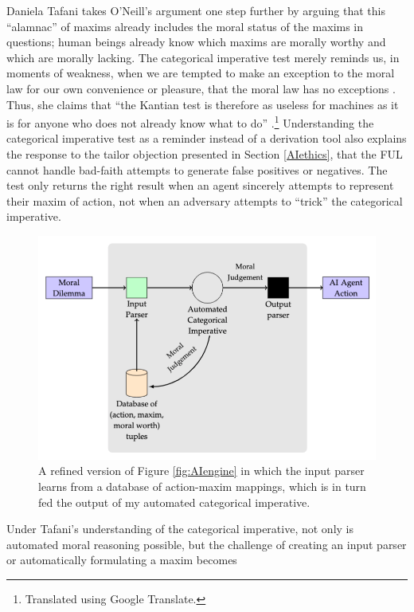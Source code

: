 \begin{isabellebody}
\begin{isamarkuptext}
Daniela Tafani takes O'Neill's argument one step further by arguing that this ``alamnac'' of maxims already 
includes the moral status of the maxims in questions; human beings already
know which maxims are morally worthy and which are morally lacking. The categorical imperative test
merely reminds us, in moments of weakness, when we are tempted to make an exception to the moral law for 
our own convenience or pleasure, that the moral law has no exceptions \citep[9]{tafani}. Thus, she claims
that ``the Kantian test is therefore as useless for machines as it is for anyone who does
not already know what to do'' \citep[8]{tafani}.\footnote{Translated using Google Translate.} 
Understanding the categorical imperative test as a reminder
instead of a derivation tool also explains the response to the tailor objection presented in Section \ref{AIethics}, that the FUL cannot 
handle bad-faith attempts to generate false positives or negatives. The test only returns the right 
result when an agent sincerely attempts to represent their maxim of action, not when an adversary attempts
 to ``trick'' the categorical imperative.%
\end{isamarkuptext}\isamarkuptrue%
%
\begin{figure}
\centering
\includegraphics[scale=0.47]{inputparser.png}
\caption{A refined version of Figure \ref{fig:AIengine} in which the input parser learns from a database
of action-maxim mappings, which is in turn fed the output of my automated categorical imperative. } \label{fig:inputparser}
\end{figure}
%
\begin{isamarkuptext}%
Under Tafani's understanding of the categorical imperative, not only is automated moral reasoning
possible, but the challenge of creating an input parser or automatically formulating a maxim becomes 

\end{isamarkuptext}
\end{isabellebody}

